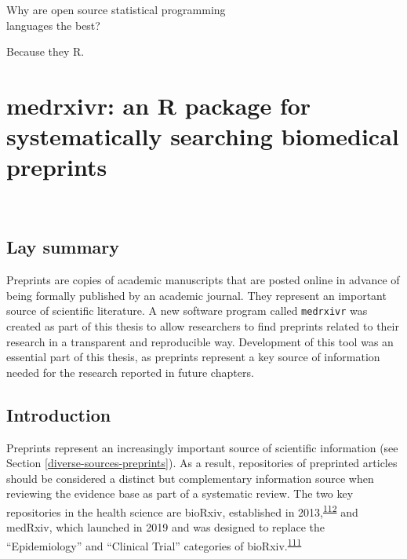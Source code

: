 \documentclass[a4paper, twoside]{templates/ociamthesis}
\begin{document}
\newpage

\begin{savequote}
Why are open source statistical programming\\
languages the best?

Because they R.
\end{savequote}



\hypertarget{sys-rev-tools-heading}{%
\chapter{medrxivr: an R package for systematically searching biomedical preprints}\label{sys-rev-tools-heading}}

~

\minitoc 

\newpage

\begin{laybox}

\hypertarget{lay-summary-1}{%
\section*{Lay summary}\label{lay-summary-1}}

Preprints are copies of academic manuscripts that are posted online in advance of being formally published by an academic journal. They represent an important source of scientific literature. A new software program called \texttt{medrxivr} was created as part of this thesis to allow researchers to find preprints related to their research in a transparent and reproducible way. Development of this tool was an essential part of this thesis, as preprints represent a key source of information needed for the research reported in future chapters.

\end{laybox}

\hypertarget{sys-rev-tools-intro}{%
\section{Introduction}\label{sys-rev-tools-intro}}

Preprints represent an increasingly important source of scientific information (see Section \ref{diverse-sources-preprints}). As a result, repositories of preprinted articles should be considered a distinct but complementary information source when reviewing the evidence base as part of a systematic review. The two key repositories in the health science are bioRxiv, established in 2013,\textsuperscript{\protect\hyperlink{ref-sever2019}{112}} and medRxiv, which launched in 2019 and was designed to replace the ``Epidemiology'' and ``Clinical Trial'' categories of bioRxiv.\textsuperscript{\protect\hyperlink{ref-rawlinson2019}{111}}
\end{document}
